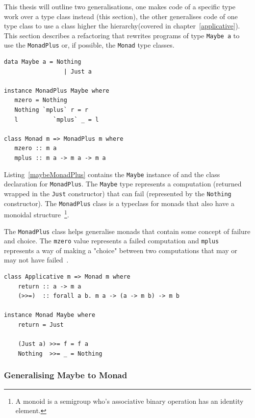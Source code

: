 This thesis will outline two generalisations, one makes code of a specific type work over a type class instead (this section), the other generalises code of one type class to use a class higher the hierarchy(covered in chapter~\ref{applicative}). This section describes a refactoring that rewrites programs of type \texttt{Maybe a} to use the \texttt{MonadPlus} or, if possible, the \texttt{Monad} type classes. 

\begin{lstlisting}[caption={The \texttt{Maybe} data type definition and \texttt{MonadPlus} instance declaration, and the \texttt{MonadPlus} class definition.},label=maybeMonadPlus]
data Maybe a = Nothing
                 | Just a
                 
instance MonadPlus Maybe where
   mzero = Nothing
   Nothing `mplus` r = r
   l          `mplus` _ = l
                 
class Monad m => MonadPlus m where
   mzero :: m a
   mplus :: m a -> m a -> m a
\end{lstlisting}
 
Listing~\ref{maybeMonadPlus} contains the \texttt{Maybe} instance of and the class declaration for \texttt{MonadPlus}. The \texttt{Maybe} type represents a computation (returned wrapped in the \texttt{Just} constructor) that can fail (represented by the \texttt{Nothing} constructor). The \texttt{MonadPlus} class is a typeclass for monads that also have a monoidal structure~\footnote{A monoid is a semigroup who's associative binary operation has an identity element.}. 

The \texttt{MonadPlus} class helps generalise monads that contain some concept of failure and choice. The \texttt{mzero} value represents a failed computation and \texttt{mplus} represents a way of making a "choice" between two computations that may or may not have failed~\citep{typeclassopedia}. 

\begin{lstlisting}[caption={\texttt{Maybe}'s monad definition}, label=maybeMonad]
class Applicative m => Monad m where
	return :: a -> m a
    (>>=)  :: forall a b. m a -> (a -> m b) -> m b
    
instance Monad Maybe where
	return = Just
	
	(Just a) >>= f = f a
	Nothing  >>= _ = Nothing
\end{lstlisting}

\subsubsection{Generalising Maybe to Monad}\label{genMonad}


